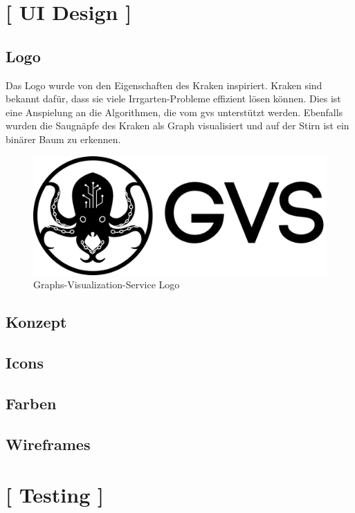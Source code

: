 \documentclass[11pt,a4paper,english,oneside]{book}
\numberwithin{equation}{chapter}
\begin{document}
\section{ [ UI Design ] }

\subsection{Logo}
Das Logo wurde von den Eigenschaften des Kraken \cite{kraken} inspiriert. Kraken sind bekannt dafür, dass sie viele Irrgarten-Probleme effizient lösen können. Dies ist eine Anspielung an die Algorithmen, die vom \gls{gvs} unterstützt werden. Ebenfalls wurden die Saugnäpfe des Kraken als Graph visualisiert und auf der Stirn ist ein binärer Baum zu erkennen. 

\begin{figure}[h!]
	\centering
	\includegraphics[width=0.7\linewidth]{assets/images/logo}
	\caption[GVS Logo]{Graphs-Visualization-Service Logo}
	\label{fig:logo}
\end{figure}





\subsection{Konzept}

\subsection{Icons}

\subsection{Farben}

\subsection{Wireframes}

\section{ [ Testing ] }
\end{document}
